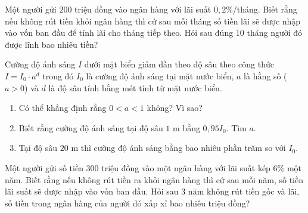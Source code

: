 \begin{ex}%
	Một người gửi $200$  triệu đồng vào ngân hàng với lãi suất $0{,}2\%$/tháng. Biết rằng nếu không rút tiền khỏi ngân hàng thì cứ sau mỗi tháng số tiền lãi sẽ được nhập vào vốn ban đầu để tính lãi cho tháng tiếp theo. Hỏi sau đúng $10$ tháng người đó được lĩnh bao nhiêu tiền?
\end{ex}

\begin{ex}%
	Cường độ ánh sáng $I$ dưới mặt biển giảm dần theo độ sâu theo công thức $I=I_0\cdot a^d$ trong đó $I_0$ là cường độ ánh sáng tại mặt nước biển, $a$ là hằng số ($a>0$) và $d$ là độ sâu tính bằng mét tính từ mặt  nước biển.
	\begin{enumerate}
		\item  Có thể khẳng định rằng $0<a<1$ không? Vì sao?
		\item Biết  rằng cường độ ánh sáng tại độ sâu $1$ m bằng $0{,}95I_0$. Tìm $a$.
		\item Tại độ sâu $20$ m thì cường độ  ánh sáng bằng bao nhiêu phần trăm so với $I_0$.
	\end{enumerate}
\end{ex}

\begin{ex}%
	Một người gửi số tiền $300$ triệu đồng vào một ngân hàng  với lãi suất kép $6\%$ một năm. Biết rằng nếu không rút tiền ra khỏi ngân hàng thì cứ sau mỗi năm, số tiền lãi suất sẽ được nhập vào vốn ban đầu. Hỏi sau $3$ năm không rút tiền gốc và lãi, số tiền trong ngân hàng của người đó xấp xỉ bao nhiêu triệu đồng?
\end{ex}


